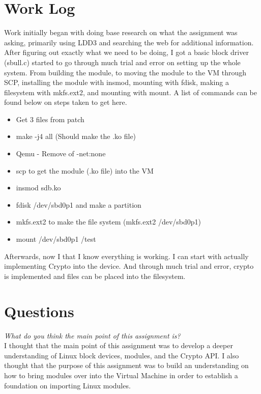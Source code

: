 \documentclass[letterpaper,10pt,titlepage]{article}
\begin{document}
\newpage

\section{Work Log}

Work initially began with doing base research on what the assignment was asking, primarily using LDD3 and searching the web for additional information.  After figuring out exactly what we need to be doing, I got a basic block driver (sbull.c) started to go through much trial and error on setting up the whole system.  From building the module, to moving the module to the VM through SCP, installing the module with insmod, mounting with fdisk, making a filesystem with mkfs.ext2, and mounting with mount.  A list of commands can be found below on steps taken to get here.\\

\begin{itemize}
\item Get 3 files from patch
\item make -j4 all (Should make the .ko file)
\item Qemu - Remove of -net:none
\item scp to get the module (.ko file) into the VM
\item insmod sdb.ko
\item fdisk /dev/sbd0p1 and make a partition
\item mkfs.ext2 to make the file system (mkfs.ext2 /dev/sbd0p1)
\item mount /dev/sbd0p1 /test
\end{itemize}

Afterwards, now I that I know everything is working.  I can start with actually implementing Crypto into the device.  And through much trial and error, crypto is implemented and files can be placed into the filesystem.\\

\section{Questions}

\textit{What do you think the main point of this assignment is?}\\

I thought that the main point of this assignment was to develop a deeper understanding of Linux block devices, modules, and the Crypto API.  I also thought that the purpose of this assignment was to build an understanding on how to bring modules over into the Virtual Machine in order to establish a foundation on importing Linux modules.\\
\end{document}
